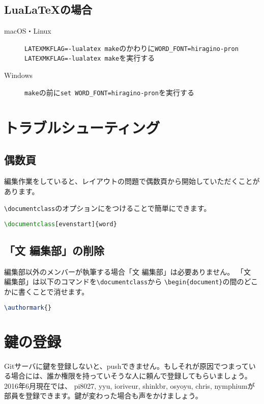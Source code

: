 \documentclass{word}
\begin{document}
\subsection{Lua\LaTeX の場合}

\begin{description}
  \item[macOS・Linux] \lstinline|LATEXMKFLAG=-lualatex make|のかわりに\lstinline|WORD_FONT=hiragino-pron LATEXMKFLAG=-lualatex make|を実行する

  \item[Windows] \lstinline|make|の前に\lstinline|set WORD_FONT=hiragino-pron|を実行する
\end{description}

\section{トラブルシューティング}

\subsection{偶数頁}

編集作業をしていると、レイアウトの問題で偶数頁から開始していただくことがあります。

\lstinline|\documentclass|のオプションにをつけることで簡単にできます。

\begin{lstlisting}[language=TeX, mathescape]
\documentclass[evenstart]{word}
\end{lstlisting}

\subsection{「文 編集部」の削除}

編集部以外のメンバーが執筆する場合「文 編集部」は必要ありません。
「文　編集部」は以下のコマンドを\lstinline|\documentclass|から
\lstinline|\begin{document}|の間のどこかに書くことで消せます。

\begin{lstlisting}[language=TeX, mathescape]
\authormark{}    
\end{lstlisting}

\section{鍵の登録}

Gitサーバに鍵を登録しないと、pushできません。もしそれが原因でつまっている場合には、誰か権限を持っていそうな人に頼んで登録してもらいましょう。2016年6月現在では、
pi8027, yyu, ioriveur, shinkbr, osyoyu, chris, nymphiumが部員を登録できます。鍵が変わった場合も声をかけましょう。
\end{document}
